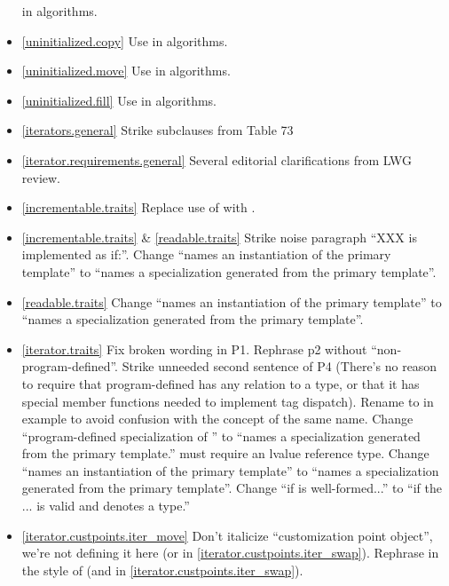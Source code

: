 \begin{itemize}
  in  algorithms.
\item \ref{uninitialized.copy} Use 
  in  algorithms.
\item \ref{uninitialized.move} Use 
  in  algorithms.
\item \ref{uninitialized.fill} Use 
  in  algorithms.
\item \ref{iterators.general} Strike subclauses from Table 73
\item \ref{iterator.requirements.general} Several editorial clarifications from
  LWG review.
\item \ref{incrementable.traits} Replace use of  with
  .
\item \ref{incrementable.traits} \& \ref{readable.traits} Strike noise paragraph
  ``XXX is implemented as if:''.
  Change ``names an instantiation of the primary template'' to
  ``names a specialization generated from the primary template''.
\item \ref{readable.traits}
  Change ``names an instantiation of the primary template'' to
  ``names a specialization generated from the primary template''.
\item \ref{iterator.traits} Fix broken wording in P1. Rephrase p2 without
  ``non-program-defined''. Strike unneeded second sentence of P4
  (There's no reason to require that program-defined 
  has any relation to a  type, or that it has special member
  functions needed to implement tag dispatch). Rename 
  to  in example to avoid confusion with the concept of the same name.
  Change ``program-defined specialization of ''
  to ``names a specialization generated from the primary template.''
   must require an lvalue reference
  type.
  Change ``names an instantiation of the primary template'' to
  ``names a specialization generated from the primary template''.
  Change ``if 
  is well-formed...'' to ``if the  ... is valid and
  denotes a type.''
\item \ref{iterator.custpoints.iter_move} Don't italicize ``customization point
  object'', we're not defining it here
  (or in \ref{iterator.custpoints.iter_swap}). Rephrase in the style of
   (and in
  \ref{iterator.custpoints.iter_swap}).

\end{itemize}
